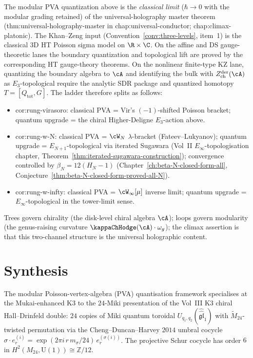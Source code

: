\begin{remark}%
\label{rem:anchor-modular-pva-quantization}%
%
%
%
The modular PVA quantization above is the \emph{classical limit}
($\hbar \to 0$ with the modular grading retained) of the
universal-holography master theorem
(\textsf{thm:universal-holography-master} in
\textsf{chap:universal-conductor}; \textsf{chap:climax-platonic}).
The Khan--Zeng input
(Convention~\ref{conv:three-levels}, item~1) is the classical
3D HT Poisson sigma model on $\R \times \C$. On the affine and DS
gauge-theoretic lanes the boundary quantization and topological lift
are proved by the corresponding HT gauge-theory theorems. On the
nonlinear finite-type KZ lane, quantizing the boundary algebra to
$\cA$ and identifying the bulk with
$Z^{\mathrm{der}}_{\mathrm{ch}}(\cA)$ as $E_3$-topological require the
analytic SDR package and quantized homotopy
$T=[Q_{\mathrm{tot}},G]$. The ladder therefore splits as follows:
\begin{itemize}[nosep]
\item \textsf{cor:rung-virasoro}: classical PVA = Vir's
 $(-1)$-shifted Poisson bracket; quantum upgrade = the chiral
 Higher-Deligne $E_3$-action above.
\item \textsf{cor:rung-w-N}: classical PVA = $\cW_N$
 $\lambda$-bracket (Fateev--Lukyanov); quantum upgrade =
 $E_{N+1}$-topological via iterated Sugawara
 (Vol~II $E_\infty$-topologisation chapter,
 Theorem~\ref{thm:iterated-sugawara-construction}); convergence
 controlled by $\beta_N = 12(H_N - 1)$
 (Chapter~\ref{ch:beta-N-closed-form-all},
 Conjecture~\ref{thm:beta-N-closed-form-proved-all-N}).
\item \textsf{cor:rung-w-infty}: classical PVA = $\cW_\infty[\mu]$
 inverse limit; quantum upgrade = $E_\infty$-topological in the
 tower-limit sense.
\end{itemize}
Trees govern chirality (the disk-level chiral algebra $\cA$); loops
govern modularity (the genus-raising curvature
$\kappaChHodge(\cA) \cdot \omega_g$); the climax assertion is
that this two-channel structure is the universal holographic
content.
\end{remark}

\section{Synthesis}
\label{sec:mpva-core-supplement}

\begin{remark}
\label{rem:mpva-core-24-miki}
The modular Poisson-vertex-algebra (PVA) quantisation framework
specialises at the Mukai-enhanced K3 to the $24$-Miki presentation of
the Vol~III K3 chiral Hall--Drinfeld double: $24$ copies of Miki
quantum toroidal
$U_{q_1, q_2}(\widehat{\widehat{\mathfrak{gl}}}_1)$ with
$\widetilde{M}_{24}$-twisted permutation via the
Cheng--Duncan--Harvey $2014$ umbral cocycle
$\sigma \cdot e^{(i)}_r = \exp(2\pi i\, r\, m_\sigma / 24)\,
e^{(\sigma(i))}_r$. The projective Schur cocycle has order $6$ in
$H^2(M_{24}, \mathrm{U}(1)) \cong \mathbb{Z}/12$.
\end{remark}
